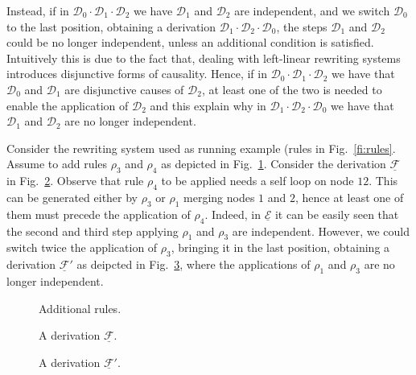 \documentclass[a4paper,UKenglish,cleveref,pdftex,thm-restate,numberwithinsect,anonymous]{lipics}
\newcommand{\dder}[1]{\mathscr{#1}}
\newcommand{\der}[1]{\underline{\dder{#1}}}
\begin{document}
Instead, if in $\dder{D}_0\cdot \dder{D}_1 \cdot \dder{D}_2$ we have $\dder{D}_1$ and $\dder{D}_2$ are
independent, and we switch $\dder{D}_0$ to the last position, obtaining a
derivation $\dder{D}_1\cdot \dder{D}_2\cdot  \dder{D}_0$, the steps $\dder{D}_1$ and $\dder{D}_2$ could be no
longer independent, unless an additional condition is
satisfied. Intuitively this is due to the fact that, dealing with
left-linear rewriting systems introduces disjunctive forms of
causality. Hence, if in $\dder{D}_0\cdot \dder{D}_1\cdot \dder{D}_2$ we have that $\dder{D}_0$ and $\dder{D}_1$ are
disjunctive causes of $\dder{D}_2$, at least one of the two is needed to
enable the application of $\dder{D}_2$ and this explain why in
$\dder{D}_1\cdot \dder{D}_2\cdot \dder{D}_0$ we have that $\dder{D}_1$ and $\dder{D}_2$ are no longer
independent.

\begin{example}
  \label{ex:non-global}
  Consider the rewriting system used as running example (rules in
  Fig.~\ref{fi:rules}. Assume to add rules $\rho_3$ and $\rho_4$ as
  depicted in Fig.~\ref{fi:rules-cas}. Consider the derivation
  $\der{F}$ in Fig.~\ref{fi:derF}. Observe that rule $\rho_4$ to be
  applied needs a self loop on node $12$. This can be generated either
  by $\rho_3$ or $\rho_1$ merging nodes $1$ and $2$, hence at least
  one of them must precede the application of $\rho_4$. Indeed, in $\der{E}$ it can be easily seen that the second and third step applying $\rho_1$ and $\rho_3$ are independent. However, we could switch twice the application of $\rho_3$, bringing it in the last position, obtaining a derivation $\der{F}'$ as deipcted in Fig.~\ref{fi:derF1}, where the applications of  $\rho_1$ and $\rho_3$ are no longer independent.
   
  \begin{figure}
        
    \caption{Additional rules.}
    \label{fi:rules-cas}
  \end{figure}

  \begin{figure}
        
    \caption{A derivation $\der{F}$.} 
    \label{fi:derF}
  \end{figure}

  \begin{figure}
        
    \caption{A derivation $\der{F}'$.} 
    \label{fi:derF1}
  \end{figure}
\end{example}
\end{document}
